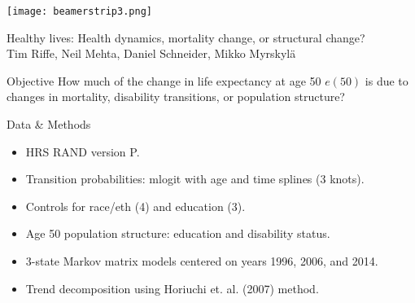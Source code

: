 \documentclass[20pt,usenames,dvipsnames]{beamer}
\begin{document}

\begin{frame}[plain]
	\vspace{-3cm}
 \centerline{\texttt{[image: beamerstrip3.png]}}

	
	\huge
	\vspace{1em}
	
	Healthy lives: Health dynamics, mortality change, or structural change?\\
	\vspace{1em}
	\large 
	Tim Riffe, Neil Mehta, Daniel Schneider, Mikko Myrskyl\"a 
\end{frame}
\begin{frame}[plain]
\Large
\begin{block}{Objective}
How much of the change in life expectancy at age 50 $e(50)$ is due to changes in mortality, disability transitions, or population structure?
\end{block}
\end{frame}
\begin{frame}[plain]
\Large
\begin{block}{Data \& Methods}
\begin{itemize}
\item HRS RAND version P. 
\item Transition probabilities: mlogit with age and time splines (3 knots).
\item Controls for race/eth (4) and education (3). 
\item Age 50 population structure: education and disability status.
\item 3-state Markov matrix models centered on years 1996, 2006, and 2014. 
\item Trend decomposition using Horiuchi et. al. (2007) method.
\end{itemize}
\end{block}
\end{frame}
\end{document}

